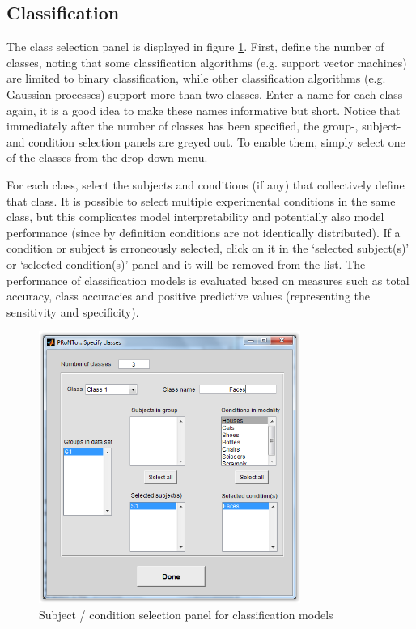 \subsection{Classification}

The class selection panel is displayed in figure \ref{fig_specify_classesC}. First, define the number of classes, noting that some classification algorithms (e.g. support vector machines) are limited to binary classification, while other classification algorithms (e.g. Gaussian processes) support more than two classes. Enter a name for each class - again, it is a good idea to make these names informative but short. Notice that immediately after the number of classes has been specified, the group-, subject- and condition selection panels are greyed out. To enable them, simply select one of the classes from the drop-down menu.

For each class, select the subjects and conditions (if any) that collectively define that class. It is possible to select multiple experimental
conditions in the same class, but this complicates model interpretability and potentially also model performance (since by definition
conditions are not identically distributed). If a condition or subject is erroneously selected, click on it in the `selected subject(s)' or
`selected condition(s)' panel and it will be removed from the list. The performance of classification models is evaluated based on measures such as total accuracy, class accuracies and positive predictive values (representing the sensitivity and specificity). 

\begin{figure}[!h]
\begin{center}
\includegraphics[height=3.5in]{images/prt_ui_model_classes.PNG}
\caption{Subject / condition selection panel for classification models}
 \label{fig_specify_classesC}
\end{center}
\end{figure}

